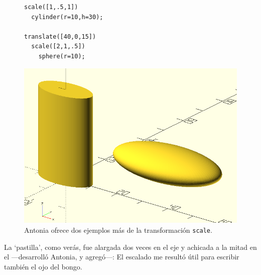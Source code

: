     \begin{figure}[ht]
  \begin{minipage}[]{.5\textwidth}
    \begin{lstlisting}
scale([1,.5,1])
  cylinder(r=10,h=30);
  
translate([40,0,15])
  scale([2,1,.5])
    sphere(r=10);
  \end{lstlisting}
  \end{minipage}\hfill
  \begin{minipage}[]{.45\textwidth}
      \centering
      \includegraphics[width=.9\textwidth]{imagenes/scale}
    \end{minipage}
    \caption{Antonia ofrece dos ejemplos más de la transformación
      \lstinline!scale!.}
    \label{fig:pastillas}
  \end{figure}

  \guillemotright La `pastilla', como verás, fue alargada dos veces en el eje
   y achicada a la mitad en el  ---desarrolló
  Antonia, y agregó---: El escalado me resultó útil para escribir
  también el ojo del bongo.

